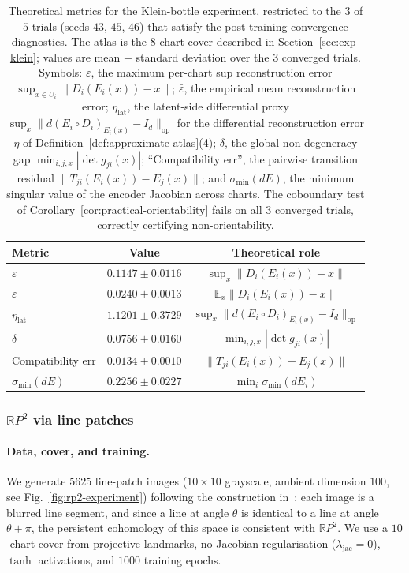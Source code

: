 \documentclass[11pt]{article}
\theoremstyle{plain}
\theoremstyle{definition}
\theoremstyle{remark}
\begin{document}
\begin{table}[ht]
\centering
\caption{Theoretical metrics for the Klein-bottle experiment,
restricted to the $3$ of $5$ trials (seeds $43$, $45$, $46$) that
satisfy the post-training convergence diagnostics. The atlas is the
$8$-chart cover described in Section~\ref{sec:exp-klein}; values are
mean $\pm$ standard deviation over the $3$ converged trials.
Symbols: $\varepsilon$, the maximum per-chart sup reconstruction error
$\sup_{x\in U_i}\|D_i(E_i(x))-x\|$; $\bar\varepsilon$, the empirical
mean reconstruction error; $\eta_{\mathrm{lat}}$, the latent-side
differential proxy
$\sup_x\|d(E_i\circ D_i)_{E_i(x)}-I_d\|_{\mathrm{op}}$ for the
differential reconstruction error $\eta$ of
Definition~\ref{def:approximate-atlas}(4); $\delta$, the global
non-degeneracy gap $\min_{i,j,x}|\det g_{ji}(x)|$; ``Compatibility err'',
the pairwise transition residual $\|T_{ji}(E_i(x))-E_j(x)\|$; and
$\sigma_{\min}(dE)$, the minimum singular value of the encoder
Jacobian across charts. The coboundary test of
Corollary~\ref{cor:practical-orientability} fails on all $3$
converged trials, correctly certifying non-orientability.}
\label{tab:klein_metrics}
\begin{tabular}{lcc}
\toprule
Metric & Value & Theoretical role \\
\midrule
$\varepsilon$            & $0.1147 \pm 0.0116$ & $\sup_x \|D_i(E_i(x)) - x\|$ \\
$\bar\varepsilon$        & $0.0240 \pm 0.0013$ & $\mathbb{E}_x \|D_i(E_i(x)) - x\|$ \\
$\eta_{\mathrm{lat}}$    & $1.1201 \pm 0.3729$ & $\sup_x \|d(E_i \circ D_i)_{E_i(x)} - I_d\|_{\mathrm{op}}$ \\
$\delta$                 & $0.0756 \pm 0.0160$ & $\min_{i,j,x} |\det g_{ji}(x)|$ \\
Compatibility err        & $0.0134 \pm 0.0010$ & $\|T_{ji}(E_i(x)) - E_j(x)\|$ \\
$\sigma_{\min}(dE)$      & $0.2256 \pm 0.0227$ & $\min_i \sigma_{\min}(dE_i)$ \\
\bottomrule
\end{tabular}
\end{table}

\subsubsection{$\mathbb{R}P^2$ via line patches}\label{sec:exp-rp2}

\paragraph{Data, cover, and training.}
We generate $5625$ line-patch images ($10 \times 10$ grayscale, ambient dimension $100$, see Fig.~\ref{fig:rp2-experiment}) following the construction in~\cite{10.1007/s00454-017-9927-2}: each image is a blurred line segment, and since a line at angle $\theta$ is identical to a line at angle $\theta + \pi$, the persistent cohomology of this space is consistent with $\mathbb{R}P^2$. We use a $10$-chart cover from projective landmarks, no Jacobian regularisation ($\lambda_{\mathrm{jac}} = 0$), $\tanh$ activations, and $1000$ training epochs.
\end{document}
